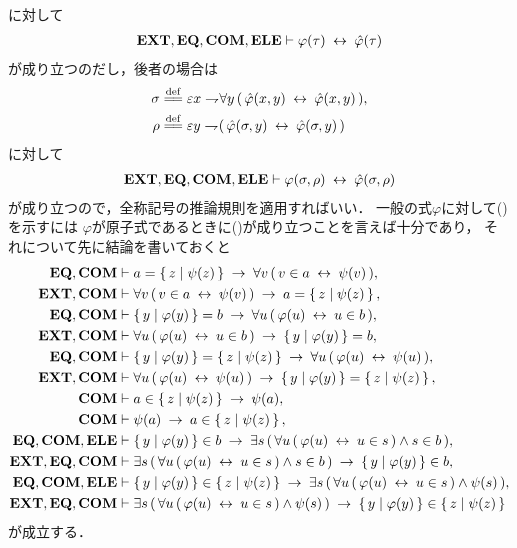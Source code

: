 	に対して
	\begin{align}
		\EXTAX,\EQAX,\COMAX,\ELEAX \vdash \varphi(\tau) \lrarrow \hat{\varphi}(\tau)
	\end{align}
	が成り立つのだし，後者の場合は
	\begin{align}
		\sigma &\defeq \varepsilon x \negation \forall y\, (\, \hat{\varphi}(x,y) \lrarrow \hat{\varphi}(x,y)\, ), \\
		\rho &\defeq \varepsilon y \negation (\, \hat{\varphi}(\sigma,y) \lrarrow \hat{\varphi}(\sigma,y)\, )
	\end{align}
	に対して
	\begin{align}
		\EXTAX,\EQAX,\COMAX,\ELEAX \vdash \varphi(\sigma,\rho) \lrarrow \hat{\varphi}(\sigma,\rho)
	\end{align}
	が成り立つので，全称記号の推論規則を適用すればいい．
	一般の式$\varphi$に対して()を示すには
	$\varphi$が原子式であるときに()が成り立つことを言えば十分であり，
	それについて先に結論を書いておくと
	\begin{align}
		\EQAX,\COMAX &\vdash a = \Set{z}{\psi(z)} 
			\rarrow \forall v\, (\, v \in a \lrarrow \psi(v)\, ), \\
		\EXTAX,\COMAX &\vdash \forall v\, (\, v \in a \lrarrow \psi(v)\, )
			\rarrow a = \Set{z}{\psi(z)}, \\
		\EQAX,\COMAX &\vdash \Set{y}{\varphi(y)} = b 
			\rarrow \forall u\, (\, \varphi(u) \lrarrow u \in b\, ), \\
		\EXTAX,\COMAX &\vdash \forall u\, (\, \varphi(u) \lrarrow u \in b\, )
			\rarrow \Set{y}{\varphi(y)} = b, \\
		\EQAX,\COMAX &\vdash \Set{y}{\varphi(y)} = \Set{z}{\psi(z)}
			\rarrow \forall u\, (\, \varphi(u) \lrarrow \psi(u)\, ), \\
		\EXTAX,\COMAX &\vdash \forall u\, (\, \varphi(u) \lrarrow \psi(u)\, )
			\rarrow \Set{y}{\varphi(y)} = \Set{z}{\psi(z)}, \\
		\COMAX &\vdash a \in \Set{z}{\psi(z)} \rarrow \psi(a), \\
		\COMAX &\vdash \psi(a) \rarrow a \in \Set{z}{\psi(z)}, \\
		\EQAX,\COMAX,\ELEAX &\vdash \Set{y}{\varphi(y)} \in b
			\rarrow \exists s\, (\, \forall u\, (\, \varphi(u) \lrarrow u \in s\, ) \wedge s \in b\, ), \\
		\EXTAX,\EQAX,\COMAX &\vdash \exists s\, (\, \forall u\, (\, \varphi(u) \lrarrow u \in s\, ) \wedge s \in b\, ) \rarrow \Set{y}{\varphi(y)} \in b, \\
		\EQAX,\COMAX,\ELEAX &\vdash \Set{y}{\varphi(y)} \in \Set{z}{\psi(z)}
			\rarrow \exists s\, (\, \forall u\, (\, \varphi(u) \lrarrow u \in s\, ) \wedge \psi(s)\, ), \\
		\EXTAX,\EQAX,\COMAX &\vdash \exists s\, (\, \forall u\, (\, \varphi(u) \lrarrow u \in s\, ) \wedge \psi(s)\, ) \rarrow \Set{y}{\varphi(y)} \in \Set{z}{\psi(z)}
	\end{align}
	が成立する．
	

